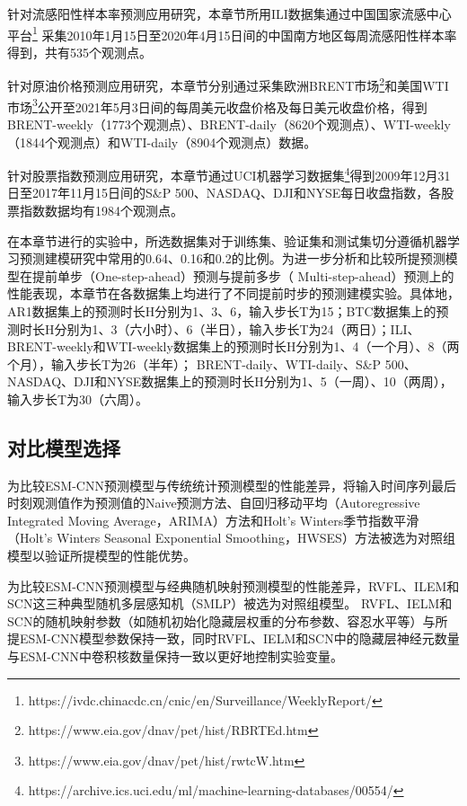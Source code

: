 针对流感阳性样本率预测应用研究，本章节所用ILI数据集通过中国国家流感中心平台\footnote{https://ivdc.chinacdc.cn/cnic/en/Surveillance/WeeklyReport/} 采集2010年1月15日至2020年4月15日间的中国南方地区每周流感阳性样本率得到，共有535个观测点。

针对原油价格预测应用研究，本章节分别通过采集欧洲BRENT市场\footnote{https://www.eia.gov/dnav/pet/hist/RBRTEd.htm}和美国WTI市场\footnote{ https://www.eia.gov/dnav/pet/hist/rwtcW.htm}公开至2021年5月3日间的每周美元收盘价格及每日美元收盘价格，得到BRENT-weekly（1773个观测点）、BRENT-daily（8620个观测点）、WTI-weekly（1844个观测点）和WTI-daily（8904个观测点）数据。

针对股票指数预测应用研究，本章节通过UCI机器学习数据集\footnote{https://archive.ics.uci.edu/ml/machine-learning-databases/00554/}得到2009年12月31日至2017年11月15日间的S\&P 500、NASDAQ、DJI和NYSE每日收盘指数，各股票指数数据均有1984个观测点。

在本章节进行的实验中，所选数据集对于训练集、验证集和测试集切分遵循机器学习预测建模研究中常用的0.64、0.16和0.2的比例。为进一步分析和比较所提预测模型在提前单步（One-step-ahead）预测与提前多步（ Multi-step-ahead）预测上的性能表现，本章节在各数据集上均进行了不同提前时步的预测建模实验。具体地，AR1数据集上的预测时长H分别为1、3、6，输入步长T为15；BTC数据集上的预测时长H分别为1、3（六小时）、6（半日），输入步长T为24（两日）；ILI、BRENT-weekly和WTI-weekly数据集上的预测时长H分别为1、4（一个月）、8（两个月），输入步长T为26（半年）； BRENT-daily、WTI-daily、S\&P 500、NASDAQ、DJI和NYSE数据集上的预测时长H分别为1、5（一周）、10（两周），输入步长T为30（六周）。

\subsection{对比模型选择}
为比较ESM-CNN预测模型与传统统计预测模型的性能差异，将输入时间序列最后时刻观测值作为预测值的Naive预测方法、自回归移动平均（Autoregressive Integrated Moving Average，ARIMA）方法\cite{floresEvolutive2012}和Holt’s Winters季节指数平滑（Holt’s Winters Seasonal Exponential Smoothing，HWSES）方法\cite{chatfieldHoltwinters1978}被选为对照组模型以验证所提模型的性能优势。

为比较ESM-CNN预测模型与经典随机映射预测模型的性能差异，RVFL\cite{igelnik1995stochastic}、ILEM\cite{huang2006universal}和SCN\cite{wang2017stochastic}这三种典型随机多层感知机（SMLP）被选为对照组模型。
RVFL、IELM和SCN的随机映射参数（如随机初始化隐藏层权重的分布参数、容忍水平等）与所提ESM-CNN模型参数保持一致，同时RVFL、IELM和SCN中的隐藏层神经元数量与ESM-CNN中卷积核数量保持一致以更好地控制实验变量。

